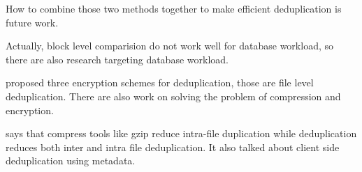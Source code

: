 How to combine those two methods together to make efficient deduplication is future work.

Actually, block level comparision do not work well for database workload, so there are also research targeting database workload. 

\citep{francinasurvey} proposed three encryption schemes for deduplication, those are file level deduplication.
There are also work on solving the problem of compression and encryption\citep{zheng2017minicrypt}.

\citep{mandagere2008demystifying} says that compress tools like gzip reduce intra-file duplication while deduplication reduces both inter and intra file deduplication. It also talked about client side deduplication using metadata.
